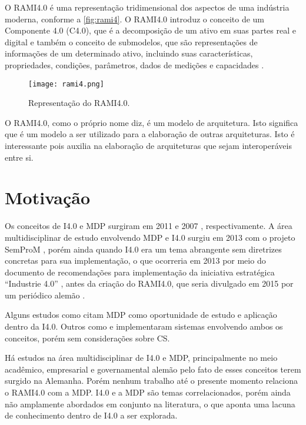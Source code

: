 O RAMI4.0 é uma representação tridimensional dos aspectos de uma indústria moderna, conforme a \autoref{fig:rami4}. O RAMI4.0 introduz o conceito de um Componente 4.0 (C4.0), que é a decomposição de um ativo em suas partes real e digital e também o conceito de submodelos, que são representações de informações de um determinado ativo, incluindo suas características, propriedades, condições, parâmetros, dados de medições e capacidades \cite{bader2019aas}.

\begin{figure}[t]
	\centering
	\texttt{[image: rami4.png]}
	\caption{Representação do RAMI4.0.}
	\label{fig:rami4}
\end{figure}

O RAMI4.0, como o próprio nome diz, é um modelo de arquitetura. Isto significa que é um modelo a ser utilizado para a elaboração de outras arquiteturas. Isto é interessante pois auxilia na elaboração de arquiteturas que sejam interoperáveis entre si.

\section{Motivação}
\label{sec:motivacao}

Os conceitos de I4.0 e MDP surgiram em 2011 \cite{kagermann2011industrie} e 2007 \cite{wahlster2007digitalmemory}, respectivamente. A área multidisciplinar de estudo envolvendo MDP e I4.0 surgiu em 2013 com o projeto SemProM \cite{wahlster2013semprom}, porém ainda quando I4.0 era um tema abrangente sem diretrizes concretas para sua implementação, o que ocorreria em 2013 por meio do documento de recomendações para implementação da iniciativa estratégica ``Industrie 4.0'' \cite{kagermann2013recommendations}, antes da criação do RAMI4.0, que seria divulgado em 2015 por um periódico alemão \cite{hankel2015rami}.

Alguns estudos como  citam MDP como oportunidade de estudo e aplicação dentro da I4.0. Outros como  e  implementaram sistemas envolvendo ambos os conceitos, porém sem considerações sobre CS.

Há estudos na área multidisciplinar de I4.0 e MDP, principalmente no meio acadêmico, empresarial e governamental alemão pelo fato de esses conceitos terem surgido na Alemanha. Porém nenhum trabalho até o presente momento relaciona o RAMI4.0 com a MDP. I4.0 e a MDP são temas correlacionados, porém ainda não amplamente abordados em conjunto na literatura, o que aponta uma lacuna de conhecimento dentro de I4.0 a ser explorada.


